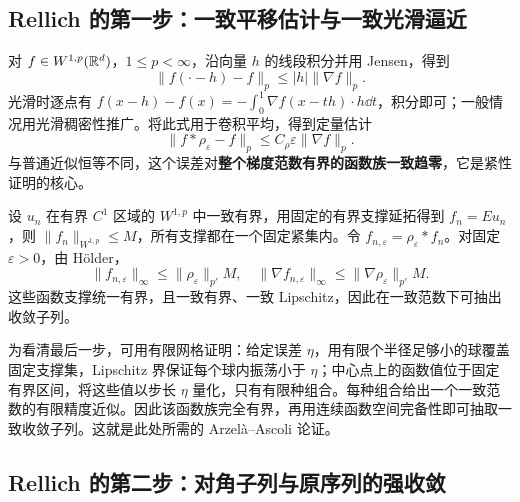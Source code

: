 \subsection{Rellich 的第一步：一致平移估计与一致光滑逼近}

对 $f\in W^{1,p}(\mathbb R^d)$，$1\le p<\infty$，沿向量 $h$ 的线段积分并用 Jensen，得到
\begin{equation}
 \|f(\cdot-h)-f\|_p\le |h|\|\nabla f\|_p.
 \label{eq:sobolev-translation-uniform}
\end{equation}
光滑时逐点有 $f(x-h)-f(x)=-\int_0^1\nabla f(x-th)\cdot h\dd t$，积分即可；一般情况用光滑稠密性推广。将此式用于卷积平均，得到定量估计
\begin{equation}
 \|f*\rho_\varepsilon-f\|_p
 \le C_\rho\varepsilon\|\nabla f\|_p.
 \label{eq:sobolev-uniform-mollify}
\end{equation}
与普通近似恒等不同，这个误差对\textbf{整个梯度范数有界的函数族一致趋零}，它是紧性证明的核心。

设 $u_n$ 在有界 $C^1$ 区域的 $W^{1,p}$ 中一致有界，用固定的有界支撑延拓得到 $f_n=Eu_n$，则 $\|f_n\|_{W^{1,p}}\le M$，所有支撑都在一个固定紧集内。令 $f_{n,\varepsilon}=\rho_\varepsilon*f_n$。对固定 $\varepsilon>0$，由 H\"older，
\[
 \|f_{n,\varepsilon}\|_\infty\le\|\rho_\varepsilon\|_{p'}M,
 \quad
 \|\nabla f_{n,\varepsilon}\|_\infty\le\|\nabla\rho_\varepsilon\|_{p'}M.
\]
这些函数支撑统一有界，且一致有界、一致 Lipschitz，因此在一致范数下可抽出收敛子列。

为看清最后一步，可用有限网格证明：给定误差 $\eta$，用有限个半径足够小的球覆盖固定支撑集，Lipschitz 界保证每个球内振荡小于 $\eta$；中心点上的函数值位于固定有界区间，将这些值以步长 $\eta$ 量化，只有有限种组合。每种组合给出一个一致范数的有限精度近似。因此该函数族完全有界，再用连续函数空间完备性即可抽取一致收敛子列。这就是此处所需的 Arzel\`a--Ascoli 论证。

\subsection{Rellich 的第二步：对角子列与原序列的强收敛}

